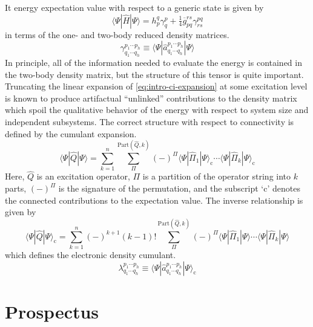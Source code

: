 \newpage
It energy expectation value with respect to a generic state is given by
\begin{equation}
    \langle\Psi|
    \hat{H}
    |\Psi\rangle
    =
    h_p^q
    \gamma^p_q
    +
    \tfrac{1}{4}
    \overline{g}_{pq}^{rs}
    \gamma^{pq}_{rs}
\end{equation}
in terms of the one- and two-body reduced density matrices.
\begin{equation}
    \gamma^{p_1\cdots p_h}_{q_1\cdots q_h}
    \equiv
    \langle\Psi|\hat{a}^{p_1\cdots p_h}_{q_1\cdots q_h}|\Psi\rangle
\end{equation}
In principle, all of the information needed to evaluate the energy is contained
in the two-body density matrix, but the structure of this tensor is quite
important.
Truncating the linear expansion of \cref{eq:intro-ci-expansion} at some
excitation level is known to produce artifactual ``unlinked'' contributions to
the density matrix which spoil the qualitative behavior of the energy with
respect to system size and independent subsystems.
The correct structure with respect to connectivity is defined by the cumulant
expansion.\cite{McCullagh:1987}
\begin{equation}
    \langle\Psi|\hat{Q}|\Psi\rangle
    =
    \sum_{k=1}^n
    \sum_{\Pi}^{\mathrm{Part}(\hat{Q}, k)}
    (-)^{\Pi}
    \langle\Psi|\hat{\Pi}_1|\Psi\rangle_\mathrm{c}
    \cdots
    \langle\Psi|\hat{\Pi}_k|\Psi\rangle_\mathrm{c}
\end{equation}
Here, \(\hat{Q}\) is an excitation operator, \(\Pi\) is a partition of the
operator string into \(k\) parts, \((-)^\Pi\) is the signature of the
permutation, and the subscript `\(\mathrm{c}\)' denotes the connected
contributions to the expectation value.
The inverse relationship is given by
\begin{equation}
    \langle\Psi|\hat{Q}|\Psi\rangle_\mathrm{c}
    =
    \sum_{k=1}^n
    (-)^{k+1}
    (k-1)!
    \sum_{\Pi}^{\mathrm{Part}(\hat{Q}, k)}
    (-)^{\Pi}
    \langle\Psi|\hat{\Pi}_1|\Psi\rangle
    \cdots
    \langle\Psi|\hat{\Pi}_k|\Psi\rangle
\end{equation}
which defines the electronic density cumulant.
\begin{equation}
    \lambda^{p_1\cdots p_h}_{q_1\cdots q_h}
    \equiv
    \langle\Psi|\hat{a}^{p_1\cdots p_h}_{q_1\cdots q_h}|\Psi\rangle_\mathrm{c}
\end{equation}



\section{Prospectus}

